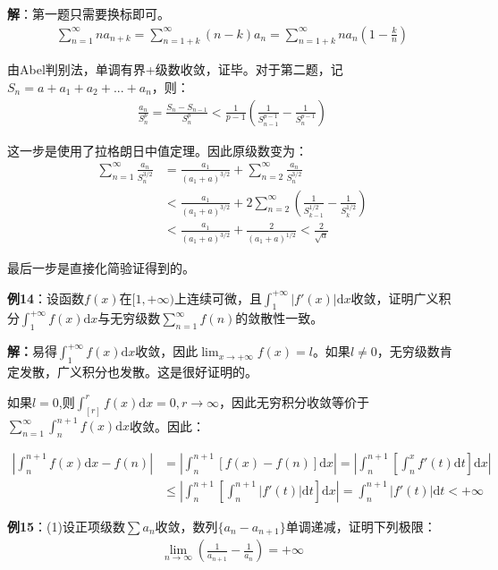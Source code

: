\documentclass{ctexart}
\let\oldtextbf\textbf
\renewcommand{\textbf}[1]{\textcolor{brown!50!red}{\oldtextbf{#1}}}
\begin{document}
\textbf{\color{brown!50!red}解}：第一题只需要换标即可。
\begin{align*} 
 \sum_{n=1}^\infty na_{n+k}=\sum_{n=1+k}^\infty(n-k)a_n=\sum_{n=1+k}^\infty na_n(1-\frac{k}{n})
\end{align*}

由Abel判别法，单调有界+级数收敛，证毕。对于第二题，记$S_n=a+a_1+a_2+...+a_n$，则：
\begin{align*} 
 \frac{a_n}{S_n^{p}}=\frac{S_n-S_{n-1}}{S_n^{p}}<\frac{1}{p-1}(\frac{1}{S_{n-1}^{p-1}}-
\frac{1}{S_n^{p-1}}  )  
\end{align*}

这一步是使用了拉格朗日中值定理。因此原级数变为：
    \begin{align*} 
 \sum_{n=1}^\infty\frac{a_n}{S_n^{3/2}}&=\frac{a_1}{(a_1+a)^{3/2}}  +\sum_{n=2}^\infty\frac{a_n}{S_n^{3/2}}\\
&<\frac{a_1}{(a_1+a)^{3/2}}+2\sum_{n=2}^\infty(\frac{1}{S_{k-1}^{1/2}}- \frac{1}{S_{k}^{1/2}})\\
&<\frac{a_1}{(a_1+a)^{3/2}}+\frac{2}{(a_1+a)^{1/2}}<\frac{2}{\sqrt{a}} 
\end{align*}

最后一步是直接化简验证得到的。

\textbf{\color{brown!50!red}例14}：设函数$f(x)$在$[1,+\infty)$上连续可微，且$\int_1^{+\infty} |f'(x)|\mathrm{d}x$收敛，证明广义积分$\int_1^{+\infty}f(x)\mathrm{d}x$与无穷级数$\sum_{n=1}^\infty f(n)$的敛散性一致。

\textbf{\color{brown!50!red}解：}易得$\int_1^{+\infty}f(x)\mathrm{d}x$收敛，因此$\lim_{x\to+\infty}f(x)=l$。如果$l\neq 0$，无穷级数肯定发散，广义积分也发散。这是很好证明的。

如果$l=0$,则$\int_{[r]}^r f(x)\mathrm{d}x=0,r\to\infty$，因此无穷积分收敛等价于$\sum_{n=1}^\infty \int_n^{n+1}f(x)\mathrm{d}x$收敛。因此：

\begin{align*} 
 |\int_n^{n+1}f(x)\mathrm{d}x-f(n) |&=|\int_n^{n+1}[f(x)-f(n)]\mathrm{d}x|=
|\int_n^{n+1}[\int_n^xf'(t)\mathrm{d}t]\mathrm{d}x|\\
&\leq |\int_n^{n+1}[\int_n^{n+1}|f'(t)|\mathrm{d}t]\mathrm{d}x|=\int_n^{n+1}|f'(t)|\mathrm{d}t<+\infty
\end{align*}

\textbf{\color{brown!50!red}例15}：(1)设正项级数$\sum a_n$收敛，数列$\{a_n-a_{n+1}\}$单调递减，证明下列极限：
\begin{align*}
    \lim_{n\to\infty}\left(\frac{1}{a_{n+1}}-\frac{1}{a_n}\right)=+\infty
\end{align*}
\end{document}
